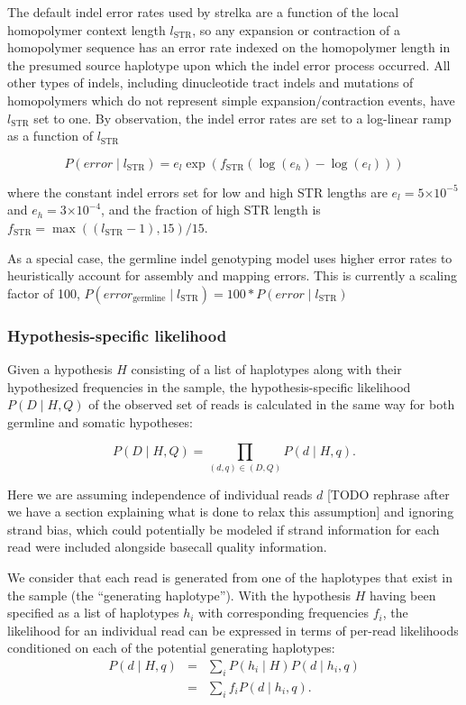 \documentclass{article}
\newcommand{\e}[1]{\ensuremath{\times 10^{#1}}}
\begin{document}
The default indel error rates used by strelka are a function of the local homopolymer context length $l_{\text{STR}}$, so any expansion or contraction of a homopolymer sequence has an error rate indexed on the homopolymer length in the presumed source haplotype upon which the indel error process occurred. All other types of indels, including dinucleotide tract indels and mutations of homopolymers which do not represent simple expansion/contraction events, have $l_{\text{STR}}$ set to one. By observation, the indel error rates are set to a log-linear ramp as a function of $l_{\text{STR}}$

\begin{equation*}
P(error \mid l_{\text{STR}}) = e_{l} \exp(f_{\text{STR}}(\log(e_{h})-\log(e_{l})))
\end{equation*}

\noindent where the constant indel errors set for low and high STR lengths are $e_{l} = 5\e{-5}$ and $e_{h} = 3\e{-4}$, and the fraction of high STR length is $f_{\text{STR}} = \max((l_{\text{STR}}-1),15)/15$.

As a special case, the germline indel genotyping model uses higher error rates to heuristically account for assembly and mapping errors. This is currently a scaling factor of 100, $P(error_{\text{germline}} \mid l_{\text{STR}}) = 100 * P(error \mid l_{\text{STR}})$

\subsubsection{Hypothesis-specific likelihood}
\label{sec:shared_lik}
Given a hypothesis $H$ consisting of a list of haplotypes along with their hypothesized frequencies in the sample, the hypothesis-specific likelihood $P(D \mid H,Q)$ of the observed set of reads is calculated in the same way for both germline and somatic hypotheses:

\begin{equation}
\label{eq:geno_lik}
P(D \mid H,Q) = \prod_{(d,q) \in (D,Q)} P(d \mid H,q).
\end{equation}

Here we are assuming independence of individual reads $d$ [TODO rephrase after we have a section explaining what is done to relax this assumption] and ignoring strand bias, which could potentially be modeled if strand information for each read were included alongside basecall quality information.

We consider that each read is generated from one of the haplotypes that exist in the sample (the ``generating haplotype''). With the hypothesis $H$ having been specified as a list of haplotypes $h_i$ with corresponding frequencies $f_i$, the likelihood for an individual read can be expressed in terms of per-read likelihoods conditioned on each of the potential generating haplotypes:
\begin{eqnarray}
P(d \mid H,q) & = & \sum_i P(h_i \mid H)P(d \mid h_i,q)\\
& = & \sum_i f_i P(d \mid h_i,q).
\end{eqnarray}
\end{document}
